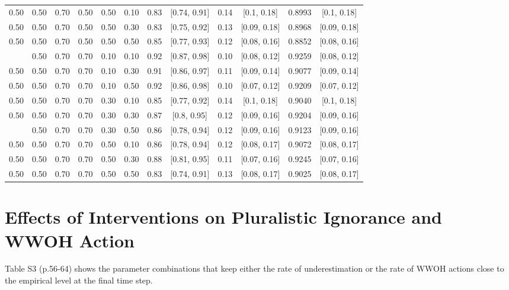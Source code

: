 \documentclass[
  11pt,
]{article}
\begin{document}
\begin{landscape}
\begin{ThreePartTable}
\begin{longtable}[t]{cccccccccccc}
0.50 & 0.50 & 0.70 & 0.50 & 0.50 & 0.10 & 0.83 & {}[0.74, 0.91] & 0.14 & {}[0.1, 0.18] & 0.8993 & {}[0.1, 0.18]\\
0.50 & 0.50 & 0.70 & 0.50 & 0.50 & 0.30 & 0.83 & {}[0.75, 0.92] & 0.13 & {}[0.09, 0.18] & 0.8968 & {}[0.09, 0.18]\\
0.50 & 0.50 & 0.70 & 0.50 & 0.50 & 0.50 & 0.85 & {}[0.77, 0.93] & 0.12 & {}[0.08, 0.16] & 0.8852 & {}[0.08, 0.16]\\
\addlinespace
0.50 & 0.50 & 0.70 & 0.70 & 0.10 & 0.10 & 0.92 & {}[0.87, 0.98] & 0.10 & {}[0.08, 0.12] & 0.9259 & {}[0.08, 0.12]\\
0.50 & 0.50 & 0.70 & 0.70 & 0.10 & 0.30 & 0.91 & {}[0.86, 0.97] & 0.11 & {}[0.09, 0.14] & 0.9077 & {}[0.09, 0.14]\\
0.50 & 0.50 & 0.70 & 0.70 & 0.10 & 0.50 & 0.92 & {}[0.86, 0.98] & 0.10 & {}[0.07, 0.12] & 0.9209 & {}[0.07, 0.12]\\
0.50 & 0.50 & 0.70 & 0.70 & 0.30 & 0.10 & 0.85 & {}[0.77, 0.92] & 0.14 & {}[0.1, 0.18] & 0.9040 & {}[0.1, 0.18]\\
0.50 & 0.50 & 0.70 & 0.70 & 0.30 & 0.30 & 0.87 & {}[0.8, 0.95] & 0.12 & {}[0.09, 0.16] & 0.9204 & {}[0.09, 0.16]\\
\addlinespace
0.50 & 0.50 & 0.70 & 0.70 & 0.30 & 0.50 & 0.86 & {}[0.78, 0.94] & 0.12 & {}[0.09, 0.16] & 0.9123 & {}[0.09, 0.16]\\
0.50 & 0.50 & 0.70 & 0.70 & 0.50 & 0.10 & 0.86 & {}[0.78, 0.94] & 0.12 & {}[0.08, 0.17] & 0.9072 & {}[0.08, 0.17]\\
0.50 & 0.50 & 0.70 & 0.70 & 0.50 & 0.30 & 0.88 & {}[0.81, 0.95] & 0.11 & {}[0.07, 0.16] & 0.9245 & {}[0.07, 0.16]\\
0.50 & 0.50 & 0.70 & 0.70 & 0.50 & 0.50 & 0.83 & {}[0.74, 0.91] & 0.13 & {}[0.08, 0.17] & 0.9025 & {}[0.08, 0.17]\\*
\end{longtable}
\end{ThreePartTable}

\newpage

\hypertarget{effects-of-interventions-on-pluralistic-ignorance-and-wwoh-action}{%
\section{Effects of Interventions on Pluralistic Ignorance and WWOH
Action}\label{effects-of-interventions-on-pluralistic-ignorance-and-wwoh-action}}

Table S3 (p.56-64) shows the parameter combinations that keep either the
rate of underestimation or the rate of WWOH actions close to the
empirical level at the final time step.


\end{landscape}
\end{document}
